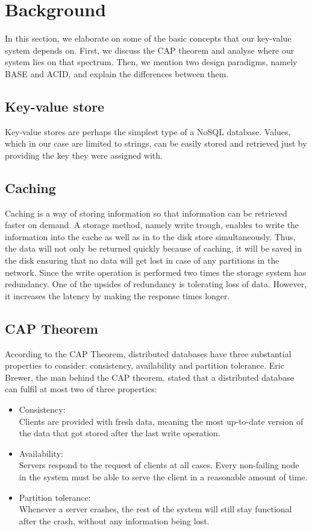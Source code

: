 \section{Background}
\label{sec:background}
In this section, we elaborate on some of the basic concepts that our key-value system depends on. First, we discuss the CAP theorem and analyse where our system lies on that spectrum. Then, we mention two design paradigms, namely BASE and ACID, and explain the differences between them.

\subsection{Key-value store}
Key-value stores are perhaps the simplest type of a NoSQL database. Values, which in our case are limited to strings, can be easily stored and retrieved just by providing the key they were assigned with. 

\subsection{Caching}
Caching is a way of storing information so that information can be retrieved faster on demand. A storage method, namely write trough, enables to write the information into the cache as well as in to the disk store simultaneously. Thus, the data will not only be returned quickly because of caching, it will be saved in the disk ensuring that no data will get lost in case of any partitions in the network. Since the write operation is performed two times the storage system has redundancy. One of the upsides of redundancy is tolerating loss of data. However, it increases the latency by making the response times longer.

\subsection{CAP Theorem}
\label{sec:background_cap} 
According to the CAP Theorem, distributed databases have three substantial properties to consider: consistency, availability and partition tolerance\cite{brewer2012cap}. Eric Brewer, the man behind the CAP theorem, stated that a distributed database can fulfil at most two of three properties\cite{brewer2000cap}:

\begin{itemize}
  \item Consistency: \\
  Clients are provided with fresh data, meaning the most up-to-date version of the data that got stored after the last write operation.
  \item Availability: \\
  Servers respond to the request of clients at all cases. Every non-failing node in the system must be able to serve the client in a reasonable amount of time\cite{gilbert2002brewer}.
  \item Partition tolerance: \\
  Whenever a server crashes, the rest of the system will still stay functional after the crash, without any information being lost.
\end{itemize}

